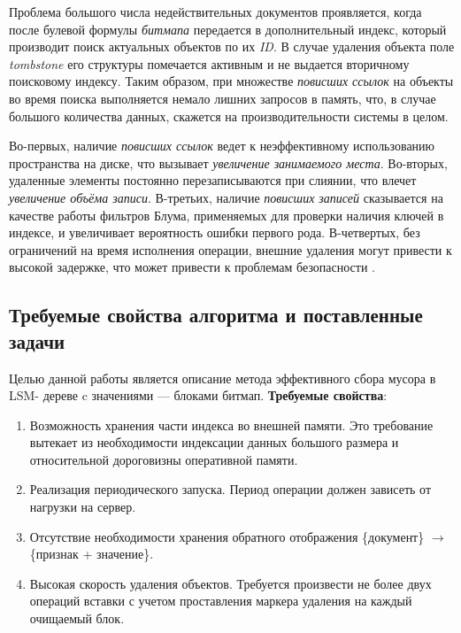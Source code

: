 Проблема большого числа недействительных документов проявляется, когда после
булевой формулы \textit{битмапа} передается в дополнительный индекс, который производит
поиск актуальных объектов по их \textit{ID}. В случае удаления объекта поле
\textit{tombstone} его структуры помечается активным и не выдается вторичному
поисковому индексу. Таким образом, при множестве \textit{повисших ссылок} на
объекты во время поиска выполняется немало лишних запросов в память, что, в
случае большого количества данных, скажется на производительности системы в целом.

Во-первых, наличие \textit{повисших ссылок} ведет к неэффективному использованию
пространства на диске, что вызывает \textit{увеличение занимаемого места}. Во-вторых,
удаленные элементы постоянно перезаписываются при слиянии, что влечет
\textit{увеличение объёма записи}. В-третьих, наличие \textit{повисших записей} сказывается
на качестве работы фильтров Блума, применяемых для проверки наличия ключей в
индексе, и увеличивает вероятность ошибки первого рода. В-четвертых, без
ограничений на время исполнения операции, внешние удаления могут привести к высокой задержке,
что может привести к проблемам безопасности \cite{Lethe:2020}.
\label{amplification}

\subsection{Требуемые свойства алгоритма и поставленные задачи}

Целью данной работы является описание метода эффективного сбора мусора в LSM-
дереве c значениями — блоками битмап. \textbf{Требуемые свойства}:
\begin{enumerate}
    \item Возможность хранения части индекса во внешней памяти. Это требование вытекает
    из необходимости индексации данных большого размера и относительной дороговизны
    оперативной памяти.
    \item Реализация периодического запуска. Период операции должен зависеть от нагрузки 
    на сервер.
    \item Отсутствие необходимости хранения обратного отображения \{документ\} $\rightarrow$
    \{признак + значение\}.
    \item Высокая скорость удаления объектов. Требуется произвести не более двух операций
    вставки с учетом проставления маркера удаления на каждый очищаемый блок.
\end{enumerate}

